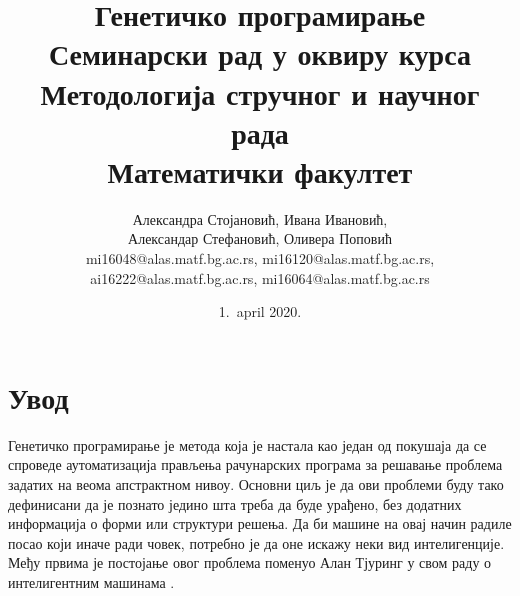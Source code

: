 \documentclass[a4paper]{article}
\begin{document}
\title{Генетичко програмирање\\ \small{Семинарски рад у оквиру курса\\Методологија стручног и научног рада\\ Математички факултет}}

\author{Александра Стојановић, Ивана Ивановић,\\ Александар Стефановић, Оливера Поповић\\ mi16048@alas.matf.bg.ac.rs, mi16120@alas.matf.bg.ac.rs,\\ ai16222@alas.matf.bg.ac.rs, mi16064@alas.matf.bg.ac.rs}

\date{1.~april 2020.}

\maketitle


\tableofcontents

\newpage

\section{Увод}

Генетичко програмирање је метода која је настала као један од покушаја да се спроведе аутоматизација прављења рачунарских програма за решавање проблема задатих на веома апстрактном нивоу. Основни циљ је да ови проблеми буду тако дефинисани да је познато једино шта треба да буде урађено, без додатних информација о форми или структури решења. Да би машине на овај начин радиле посао који иначе ради човек, потребно је да оне искажу неки вид интелигенције. Међу првима је постојање овог проблема поменуо Алан Тјуринг у свом раду о интелигентним машинама \cite{turing}.
\end{document}
